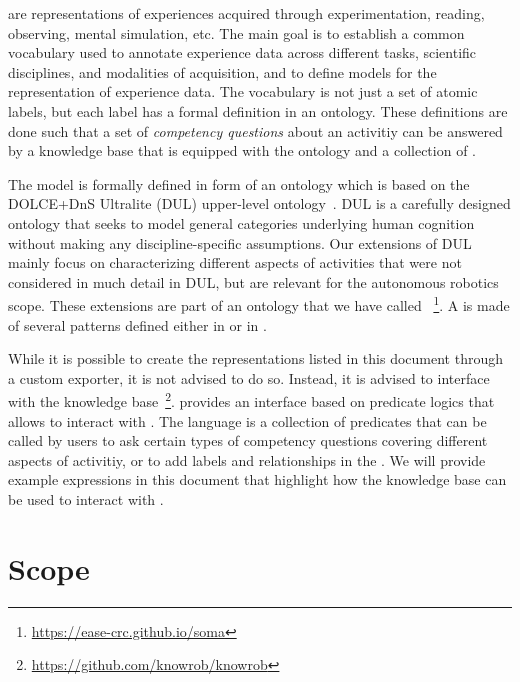 \neems are representations of experiences acquired through experimentation, reading, observing, mental simulation, etc.
The main goal is to establish a common vocabulary used to annotate experience data across different tasks, scientific disciplines, and modalities of acquisition, and to define models for the representation of experience data.
The vocabulary is not just a set of atomic labels, but each label has a formal definition in an ontology.
These definitions are done such that a set of \emph{competency questions} about an activitiy can be answered by a knowledge base that is equipped with the ontology and a collection of \neems.

The \neem model is formally defined in form of an \owl ontology which is based on the DOLCE+DnS Ultralite (DUL) upper-level ontology~\cite{DOLCE2003}.
DUL is a carefully designed ontology that seeks to model general categories underlying human cognition without making any discipline-specific assumptions.
Our extensions of DUL mainly focus on characterizing different aspects of activities that were not considered in much detail in DUL, but are relevant for the autonomous robotics scope.
These extensions are part of an ontology that we have called
\soma~\footnote{\url{https://ease-crc.github.io/soma}}.
A \neem is made of several patterns defined either in \dul or in \soma.

While it is possible to create the representations listed in this document through a custom exporter, it is not advised to do so.
Instead, it is advised to interface with the
\knowrob knowledge base~\footnote{\url{https://github.com/knowrob/knowrob}}.
\knowrob provides an interface based on predicate logics that allows to interact with \neems.
The language is a collection of predicates that can be called by users to ask certain types of competency questions covering different aspects of activitiy, or to add labels and relationships in the \neemnar.
We will provide example expressions in this document that highlight how the knowledge base can be used to interact with \neems.

\section{Scope} %
\label{sec:scope}

